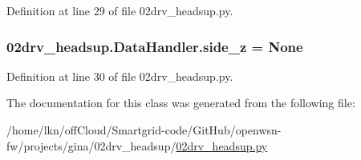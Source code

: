 Definition at line 29 of file 02drv\+\_\+headsup.\+py.

\subsubsection[{\texorpdfstring{side\+\_\+z}{side_z}}]{\setlength{\rightskip}{0pt plus 5cm}02drv\+\_\+headsup.\+Data\+Handler.\+side\+\_\+z = None\hspace{0.3cm}{\ttfamily [static]}}\hypertarget{class02drv__headsup_1_1_data_handler_a1698777e94d6b2847a26f28a983cb14a}{}\label{class02drv__headsup_1_1_data_handler_a1698777e94d6b2847a26f28a983cb14a}


Definition at line 30 of file 02drv\+\_\+headsup.\+py.



The documentation for this class was generated from the following file\+:\begin{DoxyCompactItemize}
\item 
/home/lkn/off\+Cloud/\+Smartgrid-\/code/\+Git\+Hub/openwsn-\/fw/projects/gina/02drv\+\_\+headsup/\hyperlink{02drv__headsup_8py}{02drv\+\_\+headsup.\+py}\end{DoxyCompactItemize}
